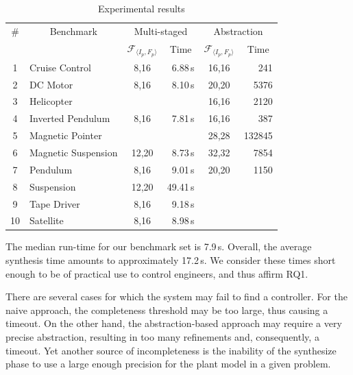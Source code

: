 \documentclass[runningheads,a4paper]{llncs}
\newcommand{\xmark}{\ding{55}}
\begin{document}
\begin{table}
\centering
\scriptsize
\begin{tabular}{| c | l | c | r | c | r |}
%
\hline
\# & \multicolumn{1}{|c|}{Benchmark}  & \multicolumn{2}{|c|}{Multi-staged}                 & \multicolumn{2}{|c|}{Abstraction} \\
   &                                  & \multicolumn{1}{|c|}{$\mathcal{F}_{\langle I_p,F_p \rangle}$} & \multicolumn{1}{|c|}{Time} & \multicolumn{1}{|c|}{$\mathcal{F}_{\langle I_p,F_p \rangle}$} & \multicolumn{1}{|c|}{Time} \\\hline
1  & Cruise Control      & 8,16   & 6.88\,s & 16,16  & 241    \\
2  & DC Motor            & 8,16   & 8.10\,s & 20,20  & 5376   \\
3  & Helicopter          & \xmark & \xmark  & 16,16  & 2120   \\
4  & Inverted Pendulum   & 8,16   & 7.81\,s & 16,16  & 387    \\
5  & Magnetic Pointer    & \xmark & \xmark  & 28,28  & 132845 \\
6  & Magnetic Suspension & 12,20  & 8.73\,s & 32,32  & 7854   \\
7  & Pendulum            & 8,16   & 9.01\,s & 20,20  & 1150   \\
8  & Suspension          & 12,20  &49.41\,s & \xmark & \xmark \\
9  & Tape Driver         & 8,16   & 9.18\,s & \xmark & \xmark \\
10 & Satellite           & 8,16   & 8.98\,s & \xmark & \xmark \\\hline
%
\end{tabular}
\caption{Experimental results\label{tab:results}}
\end{table}

The median run-time for our benchmark set is 7.9\,s.  Overall, the average
synthesis time amounts to approximately 17.2\,s.  We consider these times
short enough to be of practical use to control engineers, and thus affirm
RQ1.

There are several cases for which the system may fail to find a controller. 
For the naive approach, the completeness threshold may be too large, thus
causing a timeout.  On the other hand, the abstraction-based approach may
require a very precise abstraction, resulting in too many refinements and,
consequently, a timeout.  Yet another source of incompleteness is the
inability of the {\sc synthesize} phase to use a large enough precision for
the plant model in a given problem.
\end{document}
